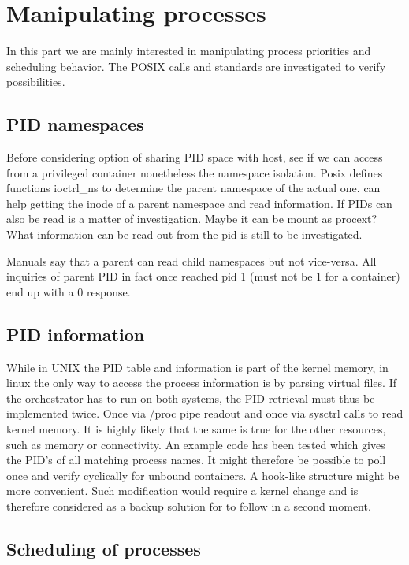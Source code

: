 \documentclass[]{scrartcl}
\begin{document}
\section{Manipulating processes}
\label{sec:mgmttest}

In this part we are mainly interested in manipulating process priorities and scheduling behavior. 
The POSIX calls and standards are investigated to verify possibilities.

\subsection{PID namespaces}

Before considering option of sharing PID space with host, see if we can access from a privileged container nonetheless the namespace isolation. 
Posix defines functions ioctrl\_ns to determine the parent namespace of the actual one. can help getting the inode of a parent namespace and read information. 
If PIDs can also be read is a matter of investigation. Maybe it can be mount as \/procext?
What information can be read out from the pid is still to be investigated.

Manuals say that a parent can read child namespaces but not vice-versa. All inquiries of parent PID in fact once reached pid 1 (must not be 1 for a container) end up with a 0 response.

\subsection{PID information}
\label{sub:pidinf}

While in UNIX the PID table and information is part of the kernel memory, in linux the only way to access the process information is by parsing virtual files. 
If the orchestrator has to run on both systems, the PID retrieval must thus be implemented twice. Once via /proc pipe readout and once via sysctrl calls to read kernel memory.
It is highly likely that the same is true for the other resources, such as memory or connectivity. 
An example code has been tested which gives the PID's of all matching process names. 
It might therefore be possible to poll once and verify cyclically for unbound containers. 
A hook-like structure might be more convenient. Such modification would require a kernel change and is therefore considered as a backup solution for to follow in a second moment.

\subsection{Scheduling of processes}
\end{document}
